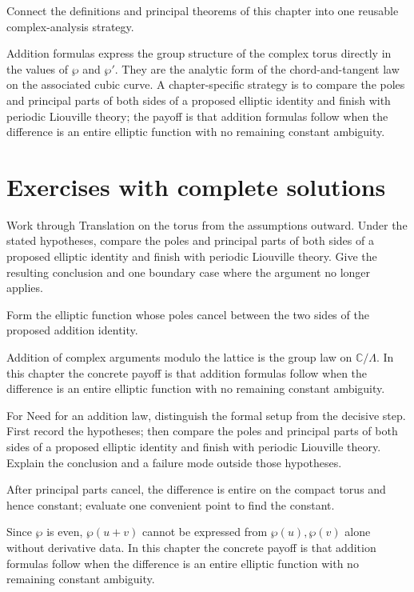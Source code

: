 \begin{problem}\label{prob:iv30-problem-12}
Connect the definitions and principal theorems of this chapter into one reusable complex-analysis strategy.
\end{problem}
\begin{solution}
Addition formulas express the group structure of the complex torus directly in the values of $\wp$ and $\wp'$. They are the analytic form of the chord-and-tangent law on the associated cubic curve. A chapter-specific strategy is to compare the poles and principal parts of both sides of a proposed elliptic identity and finish with periodic Liouville theory; the payoff is that addition formulas follow when the difference is an entire elliptic function with no remaining constant ambiguity.
\end{solution}

\section{Exercises with complete solutions}

\begin{exercise}\label{exr:iv30-01}
Work through Translation on the torus from the assumptions outward. Under the stated hypotheses, compare the poles and principal parts of both sides of a proposed elliptic identity and finish with periodic Liouville theory. Give the resulting conclusion and one boundary case where the argument no longer applies.
\end{exercise}
\begin{hint}
Form the elliptic function whose poles cancel between the two sides of the proposed addition identity.
\end{hint}
\begin{solution}
Addition of complex arguments modulo the lattice is the group law on $\mathbb C/\Lambda$. In this chapter the concrete payoff is that addition formulas follow when the difference is an entire elliptic function with no remaining constant ambiguity.
\end{solution}

\begin{exercise}\label{exr:iv30-02}
For Need for an addition law, distinguish the formal setup from the decisive step. First record the hypotheses; then compare the poles and principal parts of both sides of a proposed elliptic identity and finish with periodic Liouville theory. Explain the conclusion and a failure mode outside those hypotheses.
\end{exercise}
\begin{hint}
After principal parts cancel, the difference is entire on the compact torus and hence constant; evaluate one convenient point to find the constant.
\end{hint}
\begin{solution}
Since $\wp$ is even, $\wp(u+v)$ cannot be expressed from $\wp(u),\wp(v)$ alone without derivative data. In this chapter the concrete payoff is that addition formulas follow when the difference is an entire elliptic function with no remaining constant ambiguity.
\end{solution}

